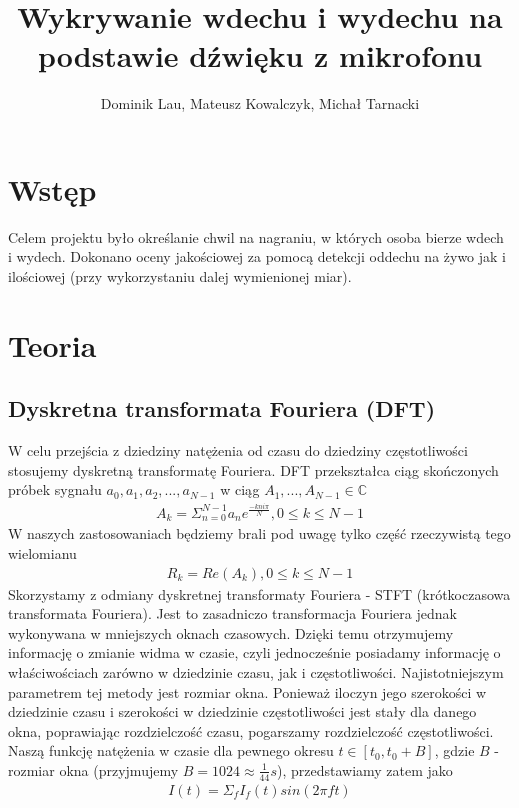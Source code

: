 \documentclass[polish]{article}
\title{Wykrywanie wdechu i wydechu na podstawie dźwięku z mikrofonu}
\author{Dominik Lau, Mateusz Kowalczyk, Michał Tarnacki}
\begin{document}
\maketitle
\tableofcontents

\section{Wstęp}
Celem projektu było określanie chwil na nagraniu, w których osoba bierze wdech i wydech. 
Dokonano oceny jakościowej za pomocą detekcji oddechu na żywo jak i ilościowej (przy wykorzystaniu dalej wymienionej miar).

\section{Teoria}
\subsection{Dyskretna transformata Fouriera (DFT)}
W celu przejścia z dziedziny natężenia od czasu do dziedziny częstotliwości stosujemy dyskretną transformatę Fouriera.  DFT przekształca ciąg skończonych próbek sygnału $a_0, a_1, a_2, ..., a_{N-1}$ w ciąg 
$A_1, ..., A_{N-1} \in \mathbb{C}$
\begin{gather*}
	A_k = \Sigma_{n=0}^{N-1} a_ne^{\frac{-kni\pi}{N}}, 0 \le k \le N-1
\end{gather*}
W naszych zastosowaniach będziemy brali pod uwagę tylko część rzeczywistą tego wielomianu
\begin{gather*}
	R_k = Re(A_k), 0 \le k \le N-1
\end{gather*}
Skorzystamy z odmiany dyskretnej transformaty Fouriera - STFT (krótkoczasowa transformata Fouriera). 
Jest to zasadniczo transformacja Fouriera jednak wykonywana w mniejszych oknach czasowych. Dzięki temu otrzymujemy informację o zmianie widma w czasie, czyli jednocześnie posiadamy informację o właściwościach zarówno w dziedzinie czasu, jak i częstotliwości. Najistotniejszym parametrem tej metody jest rozmiar okna. Ponieważ iloczyn jego szerokości w dziedzinie czasu i szerokości w dziedzinie częstotliwości jest stały dla danego okna, poprawiając rozdzielczość czasu, pogarszamy rozdzielczość częstotliwości.
Naszą funkcję natężenia w czasie dla pewnego okresu $t \in [t_0, t_0 + B]$, gdzie $B$ - rozmiar okna (przyjmujemy $B=1024\approx \frac{1}{44} s$), przedstawiamy zatem jako 
\begin{gather*}
	I(t) = \Sigma_{f} I_{f}(t)sin(2 \pi f t)
\end{gather*}
\end{document}
